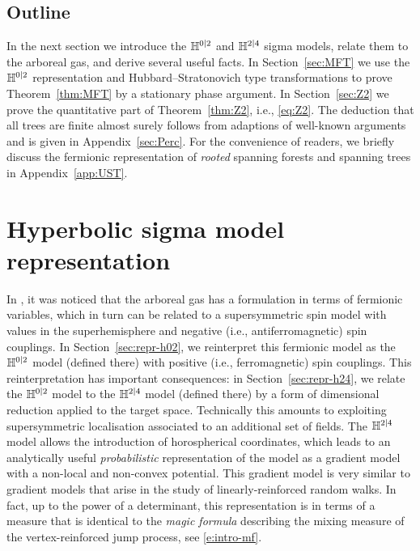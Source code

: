 \documentclass[11pt]{amsart}
\numberwithin{equation}{section}
\numberwithin{theorem}{section}
\begin{document}
\subsection{Outline}
\label{sec:outline}

In the next section we introduce the $\mathbb{H}^{0|2}$ and $\mathbb{H}^{2|4}$ sigma
models, relate them to the arboreal gas, and derive several useful
facts. In Section~\ref{sec:MFT} we use the $\mathbb{H}^{0|2}$ representation
and Hubbard--Stratonovich type transformations to prove
Theorem~\ref{thm:MFT} by a stationary phase argument. In
Section~\ref{sec:Z2} we prove the quantitative part of
Theorem~\ref{thm:Z2}, i.e., \eqref{eq:Z2}. 
The deduction that all trees are finite almost surely follows from
adaptions of well-known arguments and is given in
Appendix~\ref{sec:Perc}. For the convenience of readers, we
briefly discuss the fermionic representation of \emph{rooted}
spanning forests and spanning trees in Appendix~\ref{app:UST}.


\section{Hyperbolic sigma model representation}
\label{sec:repr}

In \cite{MR2110547}, it was noticed that the arboreal gas has a
formulation in terms of fermionic variables, which in turn can be
related to a supersymmetric spin model with values in the
superhemisphere and negative (i.e., antiferromagnetic) spin couplings.
In Section~\ref{sec:repr-h02}, we reinterpret this fermionic model as
the $\mathbb{H}^{0|2}$ model (defined there) with positive (i.e.,
ferromagnetic) spin couplings.  This reinterpretation has important
consequences: in Section~\ref{sec:repr-h24}, we relate the $\mathbb{H}^{0|2}$
model to the $\mathbb{H}^{2|4}$ model (defined there) by a form of
dimensional reduction applied to the target space.  Technically this
amounts to exploiting supersymmetric localisation associated to an
additional set of fields.  The $\mathbb{H}^{2|4}$ model allows the
introduction of horospherical coordinates, which leads to an
analytically useful \emph{probabilistic} representation of the model 
as a gradient model with a non-local and non-convex
potential. This gradient model is very similar to gradient
models that arise in the study of linearly-reinforced random
walks. In fact, up to the power of a
determinant,
this representation is in terms of a measure that is identical to the
\emph{magic formula} describing the mixing measure of the
vertex-reinforced jump process, see \eqref{e:intro-mf}.
\end{document}
